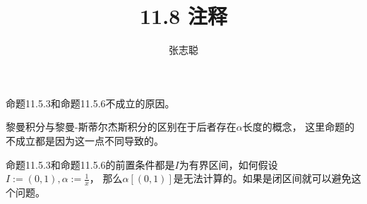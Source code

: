 \documentclass{article}
\begin{document}
\title{11.8 注释}
\author{张志聪}
\maketitle

\begin{zremark}
  命题11.5.3和命题11.5.6不成立的原因。 
\end{zremark}

黎曼积分与黎曼-斯蒂尔杰斯积分的区别在于后者存在$\alpha$长度的概念，
这里命题的不成立都是因为这一点不同导致的。

命题11.5.3和命题11.5.6的前置条件都是$I$为有界区间，如何假设$I := (0, 1),\alpha := \frac{1}{x}$，
那么$\alpha[(0, 1)]$是无法计算的。如果是闭区间就可以避免这个问题。
\end{document}
